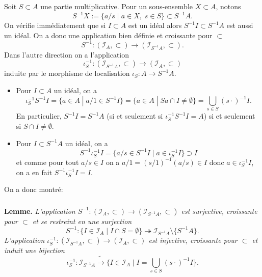 \documentclass[a4paper, 12pt]{amsart}
\begin{document}
 Soit $S\subset A$ une partie multiplicative. Pour un sous-ensemble $X\subset A$, notons $$S^{-1}X:=\lbrace  a/s\;|\; a\in X,\; s\in S\rbrace \subset S^{-1}A. $$
On vérifie immédiatement que si $I\subset A$ est un idéal alors $S^{-1}I\subset S^{-1}A$ est aussi un idéal. On a donc une application bien définie et croissante pour $\subset$
$$S^{-1}:(\mathcal{I}_A,\subset)\rightarrow (\mathcal{I}_{S^{-1}A},\subset).$$
Dans l'autre direction on a l'application $$\iota_S^{-1}:(\mathcal{I}_{S^{-1}A},\subset)\rightarrow (\mathcal{I}_A,\subset)$$ induite  par le morphisme de localisation $\iota_S:A\rightarrow S^{-1}A$. 
\begin{itemize}[leftmargin=* ,parsep=0cm,itemsep=0cm,topsep=0cm] 
\item Pour $I\subset A$ un idéal, on a 
$$\iota_S^{-1}S^{-1}I=\lbrace a\in A\;|\; a/1\in S^{-1}I\rbrace= \lbrace a\in A\;|\;  Sa\cap I\not=\emptyset\rbrace=\bigcup_{s\in S}(s\cdot)^{-1}I.$$
En particulier, $S^{-1}I=S^{-1}A$ (si et seulement si $\iota_S^{-1}S^{-1}I=A$) si et seulement si $S\cap I\not=\emptyset$.\\
\item Pour $I\subset S^{-1}A$ un idéal, on a 
$$S^{-1}\iota_S^{-1}I=\lbrace a/s\in S^{-1}I\;|\; a\in \iota_S^{-1}I\rbrace\supset I$$
et comme  pour tout $a/s\in I$ on a $a/1= (s/1)^{-1}(a/s)\in I$ donc $a\in \iota_S^{-1}I$, on a en fait $S^{-1}\iota_S^{-1}I=I$.\\
 \end{itemize}
 
 On a donc montré: 
 
\subsubsection{}\label{LocIdeaux}\textbf{Lemme.} \textit{L'application $S^{-1}:(\mathcal{I}_A,\subset)\rightarrow (\mathcal{I}_{S^{-1}A},\subset) $ est surjective, croissante pour $\subset$ et se restreint en une surjection    $$S^{-1}:\lbrace I\in\mathcal{I}_A\;|\; I\cap S=\emptyset\rbrace \twoheadrightarrow  \mathcal{I}_{S^{-1}A}\setminus \lbrace S^{-1}A\rbrace . $$
L'application $\iota_S^{-1}:(\mathcal{I}_{S^{-1}A},\subset) \rightarrow  (\mathcal{I}_A,\subset)$ est injective,  croissante pour $\subset$  et induit une bijection  
$$\iota_S^{-1}:\mathcal{I}_{S^{-1}A} \tilde{\rightarrow} \lbrace I\in\mathcal{I}_A\;|\; I=\bigcup_{s\in S}(s\cdot)^{-1}I\rbrace .$$}
\end{document}
